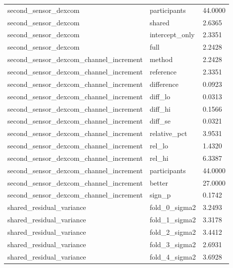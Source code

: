 {\begin{longtable}{lll}
second\_sensor\_dexcom & participants & 44.0000 \\
second\_sensor\_dexcom & shared & 2.6365 \\
second\_sensor\_dexcom & intercept\_only & 2.3351 \\
second\_sensor\_dexcom & full & 2.2428 \\
second\_sensor\_dexcom\_channel\_increment & method & 2.2428 \\
second\_sensor\_dexcom\_channel\_increment & reference & 2.3351 \\
second\_sensor\_dexcom\_channel\_increment & difference & 0.0923 \\
second\_sensor\_dexcom\_channel\_increment & diff\_lo & 0.0313 \\
second\_sensor\_dexcom\_channel\_increment & diff\_hi & 0.1566 \\
second\_sensor\_dexcom\_channel\_increment & diff\_se & 0.0321 \\
second\_sensor\_dexcom\_channel\_increment & relative\_pct & 3.9531 \\
second\_sensor\_dexcom\_channel\_increment & rel\_lo & 1.4320 \\
second\_sensor\_dexcom\_channel\_increment & rel\_hi & 6.3387 \\
second\_sensor\_dexcom\_channel\_increment & participants & 44.0000 \\
second\_sensor\_dexcom\_channel\_increment & better & 27.0000 \\
second\_sensor\_dexcom\_channel\_increment & sign\_p & 0.1742 \\
shared\_residual\_variance & fold\_0\_sigma2 & 3.2493 \\
shared\_residual\_variance & fold\_1\_sigma2 & 3.3178 \\
shared\_residual\_variance & fold\_2\_sigma2 & 3.4412 \\
shared\_residual\_variance & fold\_3\_sigma2 & 2.6931 \\
shared\_residual\_variance & fold\_4\_sigma2 & 3.6928 \\
\bottomrule
\end{longtable}}
